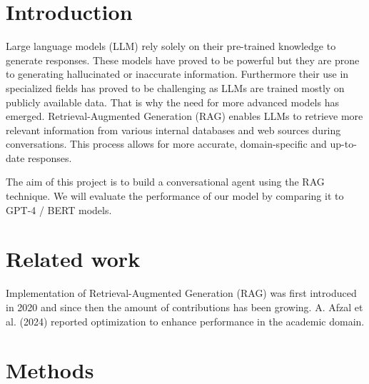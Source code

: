 \documentclass[fleqn,moreauthors,10pt]{ds_report}
\affiliation{\textit{Advisors: Aleš Žagar}}
\begin{document}
\flushbottom 

\maketitle 

\thispagestyle{empty} 


\section*{Introduction}
Large language models (LLM) rely solely on their pre-trained knowledge to generate responses. These models have proved to be powerful but they are prone to generating hallucinated or inaccurate information. Furthermore their use in specialized fields has proved to be challenging as LLMs are trained mostly on publicly available data. That is why the need for more advanced models has emerged. Retrieval-Augmented Generation (RAG) enables LLMs to retrieve more relevant information from various internal databases and web sources during conversations. This process allows for more accurate, domain-specific and up-to-date responses.

The aim of this project is to build a conversational agent using the RAG technique. We will evaluate the performance of our model by comparing it to GPT-4 / BERT models.



\section*{Related work}

Implementation of Retrieval-Augmented Generation (RAG) was first introduced in 2020 and since then the amount of contributions has been growing. A. Afzal et al. (2024) reported optimization to enhance performance in the academic domain.


\section*{Methods}
\end{document}
